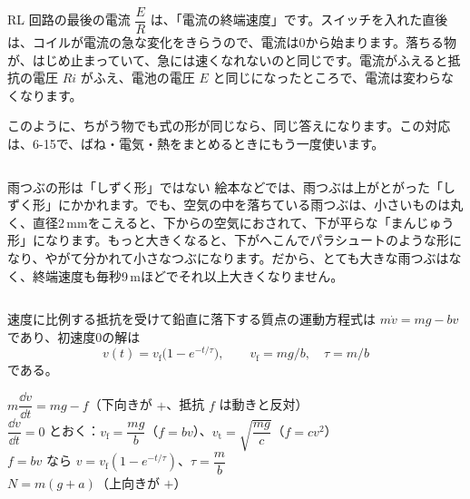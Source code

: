 RL 回路の最後の電流 $\dfrac{E}{R}$ は、「電流の終端速度」です。スイッチを入れた直後は、コイルが電流の急な変化をきらうので、電流は0から始まります。落ちる物が、はじめ止まっていて、急には速くなれないのと同じです。電流がふえると抵抗の電圧 $Ri$ がふえ、電池の電圧 $E$ と同じになったところで、電流は変わらなくなります。

このように、ちがう物でも式の形が同じなら、同じ答えになります。この対応は、6-15で、ばね・電気・熱をまとめるときにもう一度使います。



\begin{column}{雨つぶの形は「しずく形」ではない}
絵本などでは、雨つぶは上がとがった「しずく形」にかかれます。でも、空気の中を落ちている雨つぶは、小さいものは丸く、直径2\,mmをこえると、下からの空気におされて、下が平らな「まんじゅう形」になります。もっと大きくなると、下がへこんでパラシュートのような形になり、やがて分かれて小さなつぶになります。だから、とても大きな雨つぶはなく、終端速度も毎秒9\,mほどでそれ以上大きくなりません。
\end{column}

\begin{senmonsho}[大学の教科書ふうの書き方]
\begin{bkhonbun}
速度に比例する抵抗を受けて鉛直に落下する質点の運動方程式は $m\dot v=mg-bv$ であり、初速度0の解は
\[ v(t)=v_{\mathrm f}\bigl(1-e^{-t/\tau}\bigr),\qquad v_{\mathrm f}=mg/b,\quad \tau=m/b \]
である。
\end{bkhonbun}
\end{senmonsho}

\begin{taisetsu}
\def\tsl#1{\makebox[6.6\zw][l]{\sffamily\bfseries\small\color{\bkTT}#1}}
\tsl{落ちる物の式}$m\dfrac{\dd v}{\dd t}=mg-f$\quad（下向きが $+$、抵抗 $f$ は動きと反対）\\[4pt]
\tsl{終端速度}$\dfrac{\dd v}{\dd t}=0$ とおく：$v_{\mathrm f}=\dfrac{mg}{b}$（$f=bv$）、$v_{\mathrm t}=\sqrt{\dfrac{mg}{c}}$（$f=cv^2$）\\[4pt]
\tsl{速さの式}$f=bv$ なら $v=v_{\mathrm f}(1-e^{-t/\tau})$、$\tau=\dfrac{m}{b}$\\[4pt]
\tsl{体重計}$N=m(g+a)$\quad（上向きが $+$）
\end{taisetsu}

\begin{kotoba}
\small
{}
\end{kotoba}

